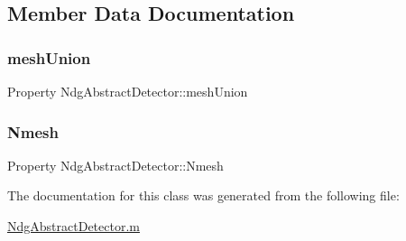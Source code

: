 \subsection{Member Data Documentation}
\mbox{\label{class_ndg_abstract_detector_aadb2239f6a1bfb04410b56818c202c0c}} 
\subsubsection{\texorpdfstring{mesh\+Union}{meshUnion}}
{\footnotesize\ttfamily Property Ndg\+Abstract\+Detector\+::mesh\+Union}

\mbox{\label{class_ndg_abstract_detector_a7836bdfeed5d39fbcbdf69c55a75b775}} 
\subsubsection{\texorpdfstring{Nmesh}{Nmesh}}
{\footnotesize\ttfamily Property Ndg\+Abstract\+Detector\+::\+Nmesh}



The documentation for this class was generated from the following file\+:\begin{DoxyCompactItemize}
\item 
\hyperlink{_ndg_abstract_detector_8m}{Ndg\+Abstract\+Detector.\+m}\end{DoxyCompactItemize}
